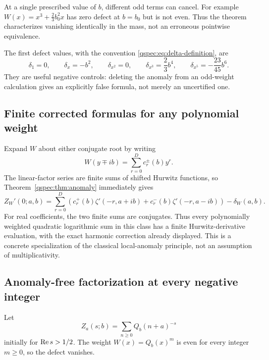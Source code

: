 \begin{remark}
At a single prescribed value of $b$, different odd terms can cancel.
For example $W(x)=x^3+\tfrac23b_0^2x$ has zero defect at $b=b_0$
but is not even. Thus the theorem characterizes vanishing identically
in the mass, not an erroneous pointwise equivalence.
\end{remark}

The first defect values, with the convention
\eqref{qspec:eq:delta-definition}, are
\begin{equation}\label{qspec:eq:anomaly-examples}
\delta_1=0,\qquad \delta_x=-b^2,\qquad
\delta_{x^2}=0,\qquad \delta_{x^3}=\frac23b^4,\qquad
\delta_{x^5}=-\frac{23}{45}b^6.
\end{equation}
They are useful negative controls: deleting the anomaly from an odd-weight
calculation gives an explicitly false formula, not merely an uncertified
one.

\subsection{Finite corrected formulas for any polynomial weight}
Expand $W$ about either conjugate root by writing
\begin{equation}\label{qspec:eq:shifted-weight-coeffs}
W(y\mp ib)=\sum_{r=0}^D c_r^\pm(b)y^r.
\end{equation}
The linear-factor series are finite sums of shifted Hurwitz functions,
so Theorem~\ref{qspec:thm:anomaly} immediately gives
\begin{equation}\label{qspec:eq:general-weighted-hurwitz}
Z_W'(0;a,b)=
\sum_{r=0}^D\left(c_r^+(b)\zeta'(-r,a+ib)
+c_r^-(b)\zeta'(-r,a-ib)\right)-\delta_W(a,b).
\end{equation}
For real coefficients, the two finite sums are conjugates. Thus every
polynomially weighted quadratic logarithmic sum in this class has a
finite Hurwitz-derivative evaluation, with the exact harmonic correction
already displayed. This is a concrete specialization of the classical
local-anomaly principle, not an assumption of multiplicativity.

\subsection{Anomaly-free factorization at every negative integer}
Let
\begin{equation}\label{qspec:eq:one-sided}
Z_a(s;b)=\sum_{n\ge0}Q_b(n+a)^{-s}
\end{equation}
initially for $\operatorname{Re} s>1/2$. The weight $W(x)=Q_b(x)^m$ is even for every
integer $m\ge0$, so the defect vanishes.

